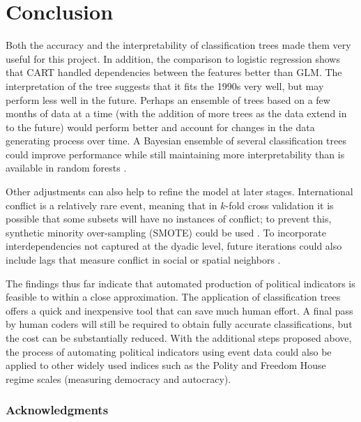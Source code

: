 \documentclass[12pt,letterpaper]{article} %
\begin{document}
\section{Conclusion}

Both the accuracy and the interpretability of classification trees made them very useful for this project. In addition, the comparison to logistic regression shows that CART handled dependencies between the features better than GLM. The interpretation of the tree suggests that it fits the 1990s very well, but may perform less well in the future. Perhaps an ensemble of trees based on a few months of data at a time (with the addition of more trees as the data extend in to the future) would perform better and account for changes in the data generating process over time. A Bayesian ensemble of several classification trees could improve performance while still maintaining more interpretability than is available in random forests \citep{arva2013improving,montgomery2012improving,Raftery:1995,raftery2005using}.

Other adjustments can also help to refine the model at later stages. International conflict is a relatively rare event, meaning that in $k$-fold cross validation it is possible that some subsets will have no instances of conflict; to prevent this, synthetic minority over-sampling (SMOTE) could be used \citep{chawla2002smote}. To incorporate interdependencies not captured at the dyadic level, future iterations could also include lags that measure conflict in social or spatial neighbors \citep{gleditsch2000war,gleditsch2001measuring,hoff2004modeling,ward1998democratizing,ward2007disputes,ward2011network}.

The findings thus far indicate that automated production of political indicators is feasible to within a close approximation. The application of classification trees offers a quick and inexpensive tool that can save much human effort. A final pass by human coders will still be required to obtain fully accurate classifications, but the cost can be substantially reduced. With the additional steps proposed above, the process of automating political indicators using event data could also be applied to other widely used indices such as the Polity and Freedom House regime scales (measuring democracy and autocracy).

\subsubsection*{Acknowledgments}
\end{document}
